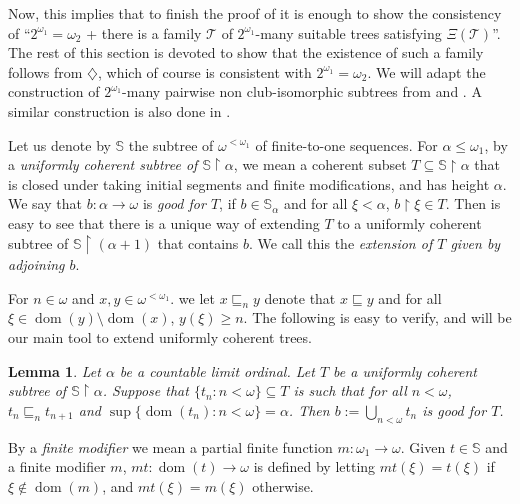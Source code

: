 \documentclass[a4paper,noamsfonts]{amsart}
\newtheorem{lemma}[theorem]{Lemma}
\theoremstyle{definition}
\newcommand{\seb}{\subseteq}
\newcommand{\setm}{\setminus}
\newcommand{\tleq}{\sqsubseteq}
\newcommand{\res}{\!\upharpoonright\!}
\newcommand{\1}{\mathbf{1}}
\newcommand{\dia}{\diamondsuit}
\newcommand{\T}{\mathcal{T}}
\newcommand{\prop}{\Xi}
\renewcommand{\S}{\mathbb{S}}
\DeclareMathOperator{\dom}{dom}
\begin{document}
Now, this implies that
to finish the proof of  it is enough to
show the consistency of ``$2^{\omega_{1}} = \omega_{2}$
+ there is a family $\T$ of $2^{\omega_{1}}$-many suitable trees
satisfying $\prop(\T)$''. The rest of this section is devoted to show that
the existence of such a family follows from
$\dia$, which of course is consistent with $2^{\omega_{1}} = \omega_{2}$.
We will adapt the construction
of $2^{\omega_{1}}$-many pairwise non club-isomorphic subtrees from
\cite{ShelahAbraham} and \cite{MartinezThesis}. A similar construction
is also done in \cite{ChavezKrueger}. 

Let us denote by $\S$ the subtree of $\omega^{<\omega_{1}}$ of finite-to-one
sequences.
For $\alpha \le \omega_{1}$, by a \emph{uniformly
  coherent subtree of $\S\res \alpha$},
we mean a coherent subset $T \seb \S\res\alpha$ that is closed under
taking initial segments and finite modifications,
and has height $\alpha$. We say that $b : \alpha \to \omega$
is \emph{good for $T$}, if $b \in \S_{\alpha}$ and
for all $\xi < \alpha$, $b\res \xi \in T$. Then
is easy to see
that there is a unique way of extending $T$ to
a uniformly coherent subtree of $\S \res (\alpha+1)$ that contains
$b$. We call this the \emph{extension of $T$ given by adjoining $b$}.

For $n \in \omega$ and $x,y \in \omega^{<\omega_{1}}$.
we let $x \tleq_{n} y$ denote that $x \tleq y$ and for all $\xi \in
\dom(y)\setm\dom(x)$, $y(\xi) \ge n$.
The following is easy to verify, and will be our main tool to extend
uniformly coherent trees.

\begin{lemma}\label{lem:fund-ext}
  Let $\alpha$ be a countable limit ordinal. Let $T$ be a uniformly
  coherent subtree of $\S \res \alpha$. Suppose that
  $\{t_{n} : n < \omega\} \seb T$ is such that for all $n < \omega$,
  $t_{n} \tleq_{n} t_{n+1}$ and
  $\sup\{\dom(t_{n}) : n < \omega\} = \alpha$. Then
  $b := \bigcup_{n < \omega}t_{n}$ is good for $T$.
\end{lemma}

By a \emph{finite modifier} we mean a partial finite function
$m : \omega_{1} \to \omega$. Given $t \in \S$ and a finite modifier
$m$, $mt : \dom(t) \to \omega$ is defined by letting
$mt(\xi) = t(\xi)$ if $\xi \notin \dom(m)$, and
$mt(\xi) = m(\xi)$ otherwise.
\end{document}
